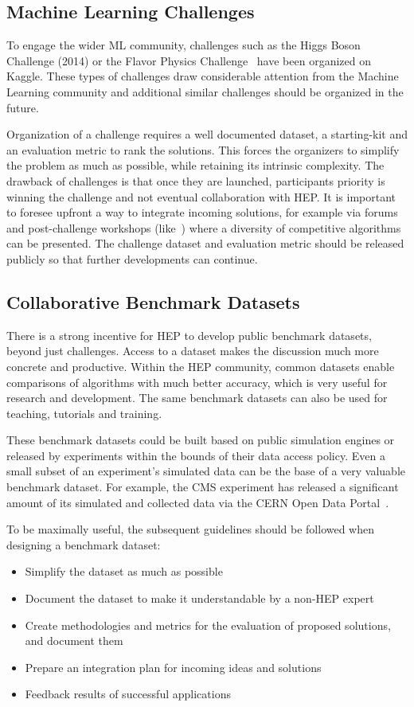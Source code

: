 \subsection{Machine Learning Challenges}

To engage the wider ML community, challenges such as the Higgs Boson Challenge (2014) or the Flavor Physics Challenge~\cite{NIPS:2015:ALEPH,FlavourDataMining} have been organized on Kaggle.
These types of challenges draw considerable attention from the Machine Learning community and additional similar challenges should be organized in the future.

Organization of a challenge requires a well documented dataset, a starting-kit and an evaluation metric to rank the solutions.
This forces the organizers to simplify the problem as much as possible, while retaining its intrinsic complexity.
The drawback of challenges is that once they are launched, participants priority is winning the challenge and not eventual collaboration with HEP.
It is important to foresee upfront a way to integrate incoming solutions, for example via forums and post-challenge workshops (like~\cite{FlavourDataMining}) where a diversity of competitive algorithms can be presented.
The challenge dataset and evaluation metric should be released publicly so that further developments can continue.

\subsection{Collaborative Benchmark Datasets}\label{subsec:benchmark}
There is a strong incentive for HEP to develop public benchmark datasets, beyond just challenges. Access to a dataset makes the discussion much more concrete and productive. Within the HEP community, common datasets enable comparisons of algorithms with much better accuracy, which is very useful for research and development. The same benchmark datasets can also be used for teaching, tutorials and training.

These benchmark datasets could be built based on public simulation engines or released by experiments within the bounds of their data access policy. Even a small subset of an experiment's simulated data can be the base of a very valuable benchmark dataset. For example, the CMS experiment has released a significant amount of its simulated and collected data via the CERN Open Data Portal~\cite{opendata}.

To be maximally useful, the subsequent guidelines should be followed when designing a benchmark dataset:
\begin{itemize}
 \item Simplify the dataset as much as possible
 \item Document the dataset to make it understandable by a non-HEP expert
 \item Create methodologies and metrics for the evaluation of proposed solutions, and document them
 \item Prepare an integration plan for incoming ideas and solutions
 \item Feedback results of successful applications
\end{itemize}

